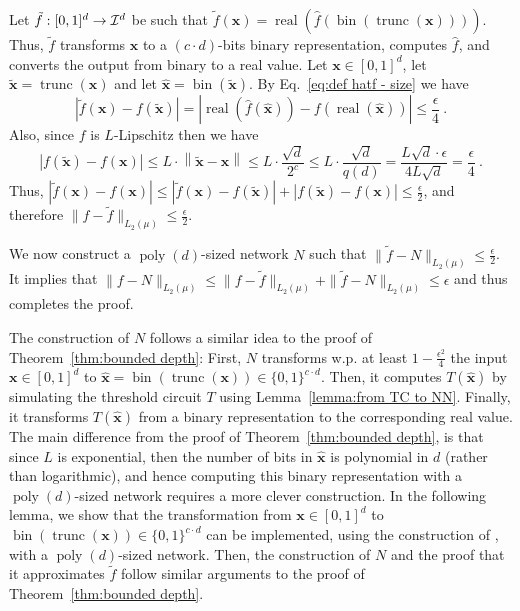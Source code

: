 \documentclass[11pt]{article}
\newcommand{\bx}{\mathbf{x}}
\newcommand{\ci}{{\cal I}}
\DeclareMathOperator{\poly}{poly}
\DeclareMathOperator{\bin}{bin}
\DeclareMathOperator{\real}{real}
\DeclareMathOperator{\trunc}{trunc}
\newcommand{\norm}[1]{\left\|#1\right\|}
\newcommand{\snorm}[1]{\|#1\|} %
\newcommand{\tbx}{{\tilde{\bx}}}
\newcommand{\hbx}{{\hat{\bx}}}
\begin{document}
Let $\tilde{f}:[0,1]^d \rightarrow \ci^d$ be such that $\tilde{f}(\bx) = \real(\hat{f}(\bin(\trunc(\bx))))$. Thus, $\tilde{f}$ transforms $\bx$ to a $(c \cdot d)$-bits binary representation, computes $\hat{f}$, and converts the output from binary to a real value.
Let $\bx \in [0,1]^d$, let $\tbx = \trunc(\bx)$ and let $\hbx = \bin(\tbx)$. 
By Eq.~\ref{eq:def hatf - size} we have 
\[
|\tilde{f}(\bx)-f(\tbx)|  
= |\real(\hat{f}(\hbx)) - f(\real(\hbx))|
\leq \frac{\epsilon}{4}~.
\] 
Also, since $f$ is $L$-Lipschitz then we have 
\[
|f(\tbx)-f(\bx)| 
\leq L \cdot \norm{\tbx-\bx} 
\leq L \cdot \frac{\sqrt{d}}{2^c}
\leq L \cdot \frac{\sqrt{d}}{q(d)}
=\frac{L \sqrt{d} \cdot \epsilon}{4 L \sqrt{d}}
= \frac{\epsilon}{4}~.
\]
Thus, $|\tilde{f}(\bx)-f(\bx)| \leq |\tilde{f}(\bx)-f(\tbx)| + |f(\tbx)-f(\bx)|  \leq \frac{\epsilon}{2}$, and therefore $\snorm{f-\tilde{f}}_{L_2(\mu)} \leq \frac{\epsilon}{2}$.

We now construct a $\poly(d)$-sized network $N$ such that $\snorm{\tilde{f}-N}_{L_2(\mu)} \leq \frac{\epsilon}{2}$. It implies that $\snorm{f-N}_{L_2(\mu)} \leq \snorm{f-\tilde{f}}_{L_2(\mu)} + \snorm{\tilde{f}-N}_{L_2(\mu)} \leq \epsilon$ and thus completes the proof.

The construction of $N$ follows a similar idea to the proof of Theorem~\ref{thm:bounded depth}:
First, $N$ transforms w.p. at least $1-\frac{\epsilon^2}{4}$ the input $\bx \in [0,1]^d$ to $\hbx = \bin(\trunc(\bx)) \in \{0,1\}^{c \cdot d}$. Then, it computes $T(\hbx)$ by simulating the threshold circuit $T$ using Lemma~\ref{lemma:from TC to NN}. Finally, it transforms $T(\hbx)$ from a binary representation to the corresponding real value.  
The main difference from the proof of Theorem~\ref{thm:bounded depth}, is that since $L$ is exponential, then the number of bits in $\hbx$ is polynomial in $d$ (rather than logarithmic), and hence computing this binary representation with a $\poly(d)$-sized network requires a more clever construction.
In the following lemma, we show that the transformation from $\bx \in [0,1]^d$ to $\bin(\trunc(\bx)) \in \{0,1\}^{c \cdot d}$ can be implemented, using the construction of \cite{telgarsky2016benefits}, with a $\poly(d)$-sized network. 
Then, the construction of $N$ and the proof that it approximates $\tilde{f}$ follow similar arguments to the proof of Theorem~\ref{thm:bounded depth}.
\end{document}
